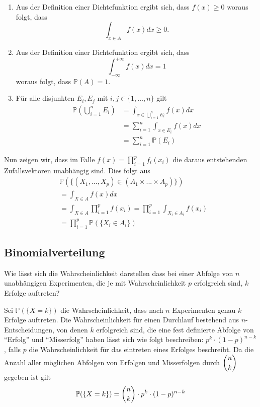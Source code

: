 \begin{enumerate}
\item Aus der Definition einer Dichtefunktion ergibt sich, dass $f(x)\geq 0$ woraus folgt, dass \begin{equation*}\int_{x\in A}f(x)dx\geq 0. \end{equation*}
\item Aus der Definition einer Dichtefunktion ergibt sich, dass \begin{equation*}\int_{-\infty}^{+\infty}f(x)dx= 1 \end{equation*} woraus folgt, dass $\mathbb{P}(A)=1$.
\item Für alle disjunkten $E_i,E_j$ mit $i,j\in \{1,\dots ,n\}$ gilt
\begin{align*}
\mathbb{P}\left(\bigcup_{i=1}^{n} E_i\right)&=\int_{x\in \bigcup_{i=1}^{n}E_i}{f(x)dx}\\
&=\sum_{i=1}^{n}{\int_{x\in E_i}{f(x)dx}}\\
&=\sum_{i=1}^{n}{\mathbb{P}(E_i)}
\end{align*}
\end{enumerate}
Nun zeigen wir, dass im Falle $f(x) = \prod_{i=1}^p f_i(x_i)$ die daraus entstehenden Zufallsvektoren unabhängig sind. Dies folgt aus
\begin{align*}
&\mathbb{P}(\{(X_{1}, ... , X_{p}) \in (A_{1} \times ... \times A_{p})\} )\\ &= \int_{X \in A}{f(x)dx}\\
&= \int_{X \in A}{\prod_{i=1}^{p}{f(x_{i})}} = \prod_{i=1}^{p}{\int_{X_{i} \in A_{i}}{f(x_{i})}}\\
&= \prod_{i=1}^{p}{\mathbb{P} (\{X_{i} \in A_{i}\})}
\end{align*}

\subsection{Binomialverteilung}
Wie lässt sich die Wahrscheinlichkeit darstellen dass bei einer Abfolge von $n$ unabhängigen Experimenten, die je mit Wahrscheinlichkeit $p$ erfolgreich sind, $k$ Erfolge auftreten?

Sei $\mathbb{P}(\{X=k\})$ die Wahrscheinlichkeit, dass nach $n$ Experimenten genau $k$ Erfolge auftreten.
Die Wahrscheinlichkeit für einen Durchlauf bestehend aus $n$-Entscheidungen, von denen $k$ erfolgreich sind, die eine fest definierte Abfolge von \enquote{Erfolg} und \enquote{Misserfolg} haben lässt sich wie folgt beschreiben:
$p^k\cdot (1-p)^{n-k}$, falls $p$ die Wahrscheinlichkeit für das eintreten eines Erfolges beschreibt. Da die Anzahl aller möglichen Abfolgen von Erfolgen und Misserfolgen durch $\dbinom{n}{k}$ gegeben ist gilt
\begin{equation*}
\mathbb{P}(\{X=k\})=\dbinom{n}{k}\cdot p^k\cdot (1-p)^{n-k}
\end{equation*}
